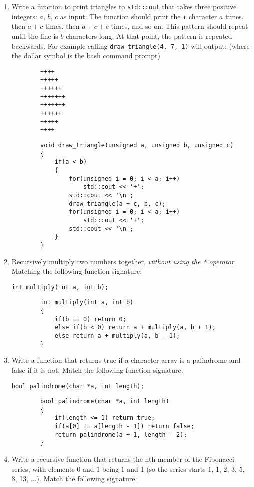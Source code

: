 \documentclass[11pt]{article}
\begin{document}
\begin{enumerate}
    \item Write a function to print triangles to \verb|std::cout| that takes three positive integers: $a$, $b$, $c$ as input. The function should print the \verb|+| character $a$ times, then $a+c$ times, then $a+c+c$ times, and so on. This pattern should repeat until the line is $b$ characters long. At that point, the pattern is repeated backwards. For example calling \verb|draw_triangle(4, 7, 1)| will output: (where the dollar symbol is the bash command prompt)
    \begin{verbatim}
        ++++
        +++++
        ++++++
        +++++++
        +++++++
        ++++++
        +++++
        ++++
    \end{verbatim} 
    \pagebreak
    \begin{verbatim}
        void draw_triangle(unsigned a, unsigned b, unsigned c)
        {
            if(a < b)
            {
                for(unsigned i = 0; i < a; i++)
                    std::cout << '+';
                std::cout << '\n';
                draw_triangle(a + c, b, c);
                for(unsigned i = 0; i < a; i++)
                    std::cout << '+';
                std::cout << '\n';
            }
        }
    \end{verbatim} 

    \item Recursively multiply two numbers together, \emph{without using the * operator}. Matching the following function signature:

        \verb|int multiply(int a, int b);|
        
        \begin{verbatim}
        int multiply(int a, int b)
        {
            if(b == 0) return 0;
            else if(b < 0) return a + multiply(a, b + 1);
            else return a + multiply(a, b - 1);
        }
        \end{verbatim} 

    \item Write a function that returns true if a character array is a palindrome and false if it is not. Match the following function signature:
    
        \verb|bool palindrome(char *a, int length);|
    
    \begin{verbatim}
        bool palindrome(char *a, int length)
        {
            if(length <= 1) return true;
            if(a[0] != a[length - 1]) return false;
            return palindrome(a + 1, length - 2);
        }
    \end{verbatim} 
    \item Write a recursive function that returns the nth member of the Fibonacci series, with elements 0 and 1 being 1 and 1 (so the series starts 1, 1, 2, 3, 5, 8, 13, ...). Match the following signature:
    

\end{enumerate}
\end{document}

